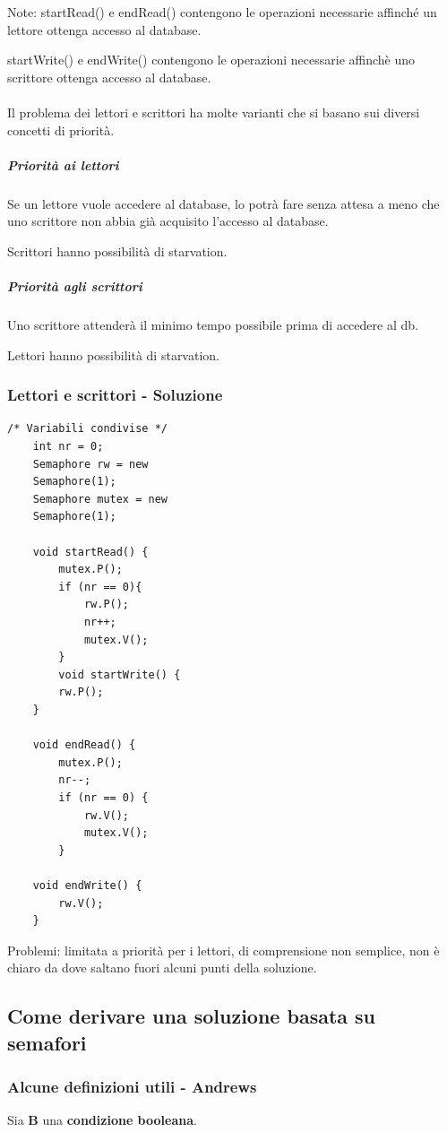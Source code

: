 Note: startRead() e endRead() contengono le operazioni
necessarie affinché un lettore ottenga accesso al database.

startWrite() e endWrite() contengono le operazioni necessarie affinchè uno scrittore ottenga accesso al database.

\paragraph{}
Il problema dei lettori e scrittori ha molte varianti che si basano sui diversi concetti di priorità.

\subparagraph{Priorità ai lettori} Se un lettore vuole accedere al database, lo potrà fare senza attesa a
meno che uno scrittore non abbia già acquisito l'accesso al database. 

Scrittori hanno possibilità di starvation.
\subparagraph{Priorità agli scrittori} Uno scrittore attenderà il minimo tempo possibile prima di accedere al db.

Lettori hanno possibilità di starvation.

\subsubsection{Lettori e scrittori - Soluzione}

\begin{lstlisting}
/* Variabili condivise */
    int nr = 0;
    Semaphore rw = new
    Semaphore(1);
    Semaphore mutex = new
    Semaphore(1);

    void startRead() {
        mutex.P();
        if (nr == 0){
            rw.P();
            nr++;
            mutex.V();
        }
        void startWrite() {
        rw.P();
    }

    void endRead() {
        mutex.P();
        nr--;
        if (nr == 0) {
            rw.V();
            mutex.V();
        }

    void endWrite() {
        rw.V();
    }
\end{lstlisting}

Problemi: limitata a priorità per i lettori, di comprensione non semplice, non è chiaro da dove saltano fuori alcuni punti della soluzione.

\subsection{Come derivare una soluzione basata su semafori}
\subsubsection{Alcune definizioni utili - Andrews}
Sia \textbf{B} una \textbf{condizione booleana}.

